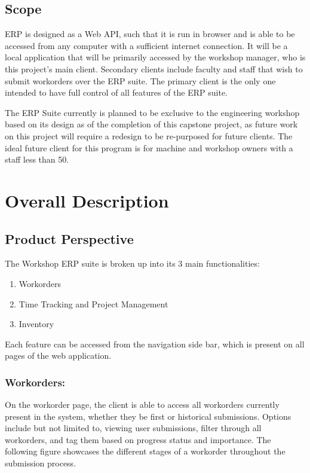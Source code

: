 \subsection{Scope}
ERP is designed as a Web API, such that it is run in browser and is able to be accessed from any computer with a sufficient internet connection. It will be a local application that will be primarily accessed by the workshop manager, who is this project's main client. Secondary clients include faculty and staff that wish to submit workorders over the ERP suite. The primary client is the only one intended to have full control of all features of the ERP suite. 
\newline
{\setlength{\parindent}{0cm}

The ERP Suite currently is planned to be exclusive to the engineering workshop based on its design as of the completion of this capstone project, as future work on this project will require a redesign to be re-purposed for future clients. The ideal future client for this program is for machine and workshop owners with a staff less than 50.  

\newpage

\section{Overall Description}
\subsection{Product Perspective}
The Workshop ERP suite is broken up into its 3 main functionalities: 

	\begin{enumerate}
	\item Workorders
	\item Time Tracking and Project Management 
	\item Inventory
	\end{enumerate}

Each feature can be accessed from the navigation side bar, which is present on all pages of the web application. 

\subsubsection{Workorders:}
On the workorder page, the client is able to access all workorders currently present in the system, whether they be first or historical submissions. Options include but not limited to, viewing user submissions, filter through all workorders, and tag them based on progress status and importance. The following figure showcases the different stages of a workorder throughout the submission process.
 
}
